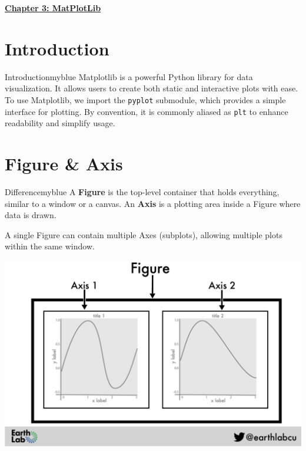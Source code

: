 \newpage
\begin{center}
    \Huge{\textbf{\underline{Chapter 3: MatPlotLib}}}
\end{center}

\setcounter{section}{0}


\section{Introduction}
\begin{prettyBox}{Introduction}{myblue}
Matplotlib is a powerful Python library for data visualization. It allows users to create both
static and interactive plots with ease. \\[0.1cm]
To use Matplotlib, we import the \texttt{pyplot} submodule, which provides a simple interface
for plotting. By convention, it is commonly aliased as \texttt{plt} to enhance readability and
simplify usage.
\end{prettyBox}

\vspace{0.5cm}


\section{Figure \& Axis}
\begin{prettyBox}{Difference}{myblue}
A \textbf{Figure} is the top-level container that holds everything, similar to a window or a canvas.  
An \textbf{Axis} is a plotting area inside a Figure where data is drawn.  

A single Figure can contain multiple Axes (subplots), allowing multiple plots within the same window.
\end{prettyBox}

\vspace{0.5cm}

\begin{center}
    \includegraphics[height = 0.4\textheight]{Chapters/PNG/figureAxis.png}
\end{center}



